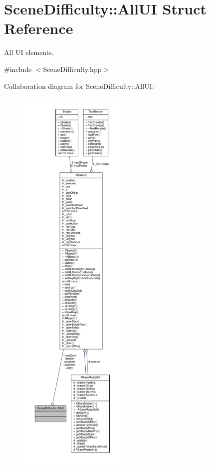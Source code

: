 \hypertarget{struct_scene_difficulty_1_1_all_u_i}{}\section{Scene\+Difficulty\+:\+:All\+UI Struct Reference}
\label{struct_scene_difficulty_1_1_all_u_i}


All UI elements.  




{\ttfamily \#include $<$Scene\+Difficulty.\+hpp$>$}



Collaboration diagram for Scene\+Difficulty\+:\+:All\+UI\+:
\nopagebreak
\begin{figure}[H]
\begin{center}
\leavevmode
\includegraphics[height=550pt]{struct_scene_difficulty_1_1_all_u_i__coll__graph}
\end{center}
\end{figure}
